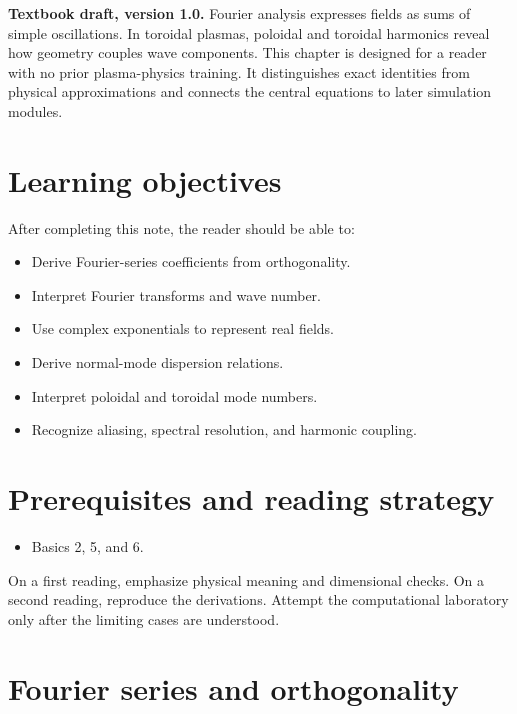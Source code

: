 \documentclass[11pt]{article}
\begin{document}

\begin{overviewbox}
\textbf{Textbook draft, version 1.0.} Fourier analysis expresses fields as sums of simple oscillations. In toroidal plasmas, poloidal and toroidal harmonics reveal how geometry couples wave components. This chapter is designed for a reader with no prior plasma-physics training. It distinguishes exact identities from physical approximations and connects the central equations to later simulation modules.
\end{overviewbox}

\ProjectTOC

\section{Learning objectives}
After completing this note, the reader should be able to:
\begin{itemize}[leftmargin=1.6em]
\item Derive Fourier-series coefficients from orthogonality.
\item Interpret Fourier transforms and wave number.
\item Use complex exponentials to represent real fields.
\item Derive normal-mode dispersion relations.
\item Interpret poloidal and toroidal mode numbers.
\item Recognize aliasing, spectral resolution, and harmonic coupling.
\end{itemize}

\section{Prerequisites and reading strategy}
\begin{itemize}[leftmargin=1.6em]
\item Basics 2, 5, and 6.
\end{itemize}
On a first reading, emphasize physical meaning and dimensional checks. On a second reading, reproduce the derivations. Attempt the computational laboratory only after the limiting cases are understood.

\section{Fourier series and orthogonality}
\end{document}
